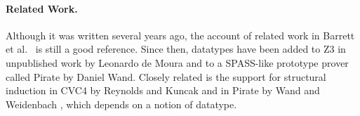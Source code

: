 






\paragraph{Related Work.}
Although it was written several years ago, the account of related work in
Barrett et al.\ \cite{barrett-et-al-2007} is still a good reference.
Since then, datatypes have been added to Z3 in unpublished work by Leonardo de
Moura and to a SPASS-like prototype prover called Pirate by Daniel Wand.
Closely related is the support for structural
induction in CVC4 by Reynolds and Kuncak \cite{reynolds-kuncak-2015} and in
Pirate by Wand and Weidenbach \cite{wand-weidenbach-201x}, which depends on a
notion of datatype.

% 

